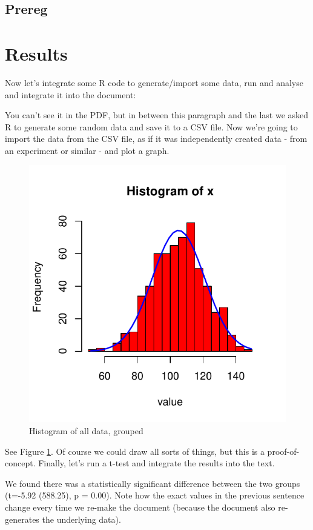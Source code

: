 \documentclass[
  ,jou,floatsintext]{apa6}
\begin{document}
\hypertarget{prereg}{%
\subsection{Prereg}\label{prereg}}

\hypertarget{results}{%
\section{Results}\label{results}}

Now let's integrate some R code to generate/import some data, run and analyse and integrate it into the document:

You can't see it in the PDF, but in between this paragraph and the last we asked R to generate some random data and save it to a CSV file. Now we're going to import the data from the CSV file, as if it was independently created data - from an experiment or similar - and plot a graph.

\begin{figure}

{\centering \includegraphics[width=0.75\linewidth]{faithinreason_files/figure-latex/ourhistogram-1} 

}

\caption{Histogram of all data, grouped}\label{fig:ourhistogram}
\end{figure}

See Figure \ref{fig:ourhistogram}. Of course we could draw all sorts of things, but this is a proof-of-concept. Finally, let's run a t-test and integrate the results into the text.

We found there was a statistically significant difference between the two groups (t=-5.92 (588.25), p = 0.00). Note how the exact values in the previous sentence change every time we re-make the document (because the document also re-generates the underlying data).
\end{document}

